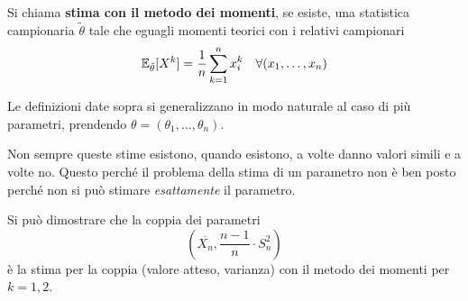 \begin{definition}
	Si chiama \textbf{stima con il metodo dei momenti}, se esiste, una statistica campionaria
	$\tilde{\theta}$ tale che eguagli momenti teorici con i relativi campionari
	\[ \mathbb{E}_{\tilde{\theta}} [X^k] = \frac{1}{n} \sum_{k=1}^{n} x_i^k \quad \forall(x_1, \dots, x_n) \]
\end{definition}

\begin{observation}
	Le definizioni date sopra si generalizzano in modo naturale al caso di più parametri, prendendo
	$\theta = (\theta_1, \dots, \theta_n)$.
\end{observation}

\begin{observation}
	Non sempre queste stime esistono, quando esistono, a volte danno valori simili e a volte no.
	Questo perché il problema della stima di un parametro non è ben posto perché non si può stimare
	\emph{esattamente} il parametro.
\end{observation}

Si può dimostrare che la coppia dei parametri
\[ \left( \overline{X_n}, \frac{n-1}{n} \cdot S_n^2 \right) \]
è la stima per la coppia (valore atteso, varianza) con il metodo dei momenti per $k=1,2$.

